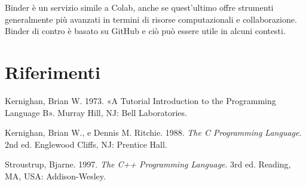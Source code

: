 \documentclass[
  letterpaper,
  DIV=11,
  numbers=noendperiod]{scrreprt}
\newlength{\cslhangindent}
\newenvironment{CSLReferences}[2] %
 {\begin{list}{}{%
  \setlength{\itemindent}{0pt}
  \setlength{\leftmargin}{0pt}
  \setlength{\parsep}{0pt}
  \ifodd #1
   \setlength{\leftmargin}{\cslhangindent}
   \setlength{\itemindent}{-1\cslhangindent}
  \fi
  \setlength{\itemsep}{#2\baselineskip}}}
 {\end{list}}
\begin{document}
Binder è un servizio simile a Colab, anche se quest'ultimo offre
strumenti generalmente più avanzati in termini di risorse computazionali
e collaborazione. Binder di contro è basato su GitHub e ciò può essere
utile in alcuni contesti.

\cleardoublepage
{}
{}
\appendix

\chapter*{Riferimenti}\label{riferimenti}


\label{refs}
\begin{CSLReferences}{1}{0}
Kernighan, Brian W. 1973. {«A Tutorial Introduction to the Programming
Language B»}. Murray Hill, NJ: Bell Laboratories.

Kernighan, Brian W., e Dennis M. Ritchie. 1988. \emph{The C Programming
Language}. 2nd ed. Englewood Cliffs, NJ: Prentice Hall.

Stroustrup, Bjarne. 1997. \emph{The C++ Programming Language}. 3rd ed.
Reading, MA, USA: Addison-Wesley.

\end{CSLReferences}
\end{document}
